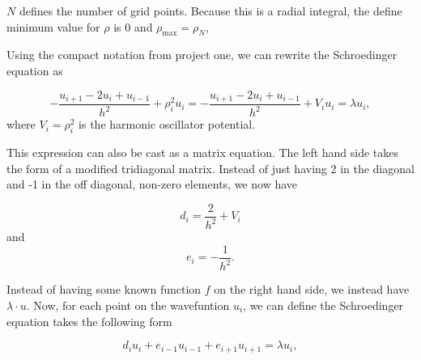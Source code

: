 \documentclass[%
oneside,                 %
final,                   %
10pt]{article}
\begin{document}
$N$ defines the number of grid points. Because this is a radial integral, the define minimum value for $\rho$ is 0 and  $\rho_{\mathrm{max}}=\rho_N$,

Using the compact notation from project one, we can rewrite the Schroedinger equation as

\[
-\frac{u_{i+1} -2u_i +u_{i-1}}{h^2}+\rho_i^2u_i=-\frac{u_{i+1} -2u_i +u_{i-1} }{h^2}+V_iu_i  = \lambda u_i,
\]
where $V_i=\rho_i^2$ is the harmonic oscillator potential.

This expression can also be cast as a matrix equation.  The left hand side takes the form of a modified tridiagonal matrix.  Instead of just having 2 in the diagonal and -1 in the off diagonal, non-zero elements, we now have 

\begin{equation*}
   d_i=\frac{2}{h^2}+V_i
\end{equation*}
and 
\begin{equation*}
   e_i=-\frac{1}{h^2}.
\end{equation*}

Instead of having some known function $f$ on the right hand side, we instead have $\lambda \cdot u$.  Now, for each point on the wavefuntion $u_i$, we can define the Schroedinger equation takes the following form

\begin{equation*}
d_iu_i+e_{i-1}u_{i-1}+e_{i+1}u_{i+1}  = \lambda u_i,
\end{equation*}
\end{document}
